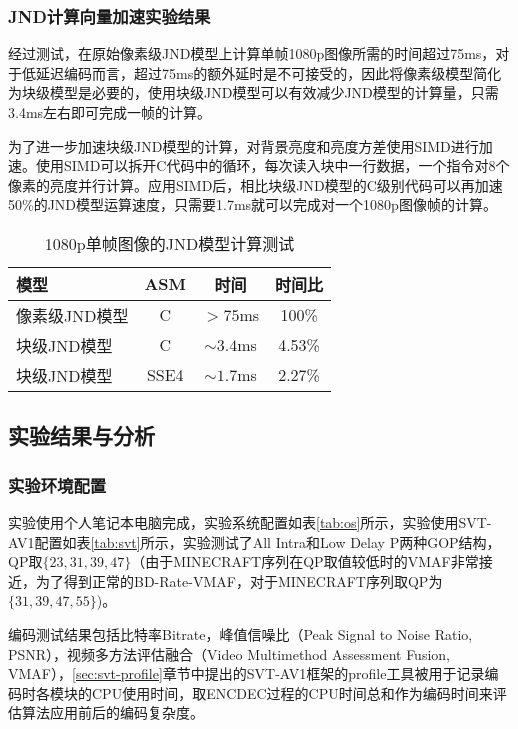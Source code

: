 	\subsubsection{JND计算向量加速实验结果}
  经过测试，在原始像素级JND模型上计算单帧1080p图像所需的时间超过75ms，对于低延迟编码而言，超过75ms的额外延时是不可接受的，因此将像素级模型简化为块级模型是必要的，使用块级JND模型可以有效减少JND模型的计算量，只需3.4ms左右即可完成一帧的计算。

  为了进一步加速块级JND模型的计算，对背景亮度和亮度方差使用SIMD进行加速。使用SIMD可以拆开C代码中的循环，每次读入块中一行数据，一个指令对8个像素的亮度并行计算。应用SIMD后，相比块级JND模型的C级别代码可以再加速50\%的JND模型运算速度，只需要1.7ms就可以完成对一个1080p图像帧的计算。

  \begin{table}[!hpt]
    \renewcommand{\arraystretch}{0.9}
    \caption{1080p单帧图像的JND模型计算测试}
    \label{tab:jnd-compute}
    \centering
    \begin{tabular}{lccc} \toprule
      模型 & ASM & 时间 &时间比  \\ \midrule
      像素级JND模型 & C   & $>75$ms & 100\% \\
      块级JND模型   & C & $\sim 3.4$ms & 4.53\% \\
      块级JND模型   & SSE4 & $\sim 1.7$ms & 2.27\%\\ \bottomrule
    \end{tabular}
  \end{table}



  \subsection{实验结果与分析\label{sec:jnd-test}}

  \subsubsection{实验环境配置}
  实验使用个人笔记本电脑完成，实验系统配置如表\ref{tab:os}所示，实验使用SVT-AV1配置如表\ref{tab:svt}所示，实验测试了All Intra和Low Delay P两种GOP结构，QP取$\{23, 31, 39, 47\}$（由于MINECRAFT序列在QP取值较低时的VMAF非常接近，为了得到正常的BD-Rate-VMAF，对于MINECRAFT序列取QP为$\{31, 39, 47, 55\}$)。

  编码测试结果包括比特率Bitrate，峰值信噪比（Peak Signal to Noise Ratio, PSNR），视频多方法评估融合（Video Multimethod Assessment Fusion, VMAF\cite{liPracticalPerceptualVideo}），\ref{sec:svt-profile}章节中提出的SVT-AV1框架的profile工具被用于记录编码时各模块的CPU使用时间，取ENCDEC过程的CPU时间总和作为编码时间来评估算法应用前后的编码复杂度。

